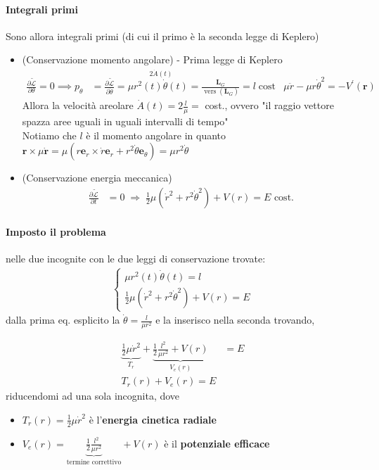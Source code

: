 \documentclass[a4paper,10pt]{article}
\theoremstyle{definition}
\DeclareMathOperator*{\vers}{vers}
\newcommand{\bv}{\boldsymbol} %
\theoremstyle{indentdefinition}
\theoremstyle{indenttheorem}
\theoremstyle{myremark}
\theoremstyle{indentgeneral}
\begin{document}
\paragraph{Integrali primi} Sono allora integrali primi (di cui il primo è la seconda legge di
Keplero)
\begin{itemize}
    \item (Conservazione momento angolare) - Prima legge di Keplero
    \begin{align*}
       \frac{\partial \widetilde{\mathcal{L}}}{\partial\theta}=0\implies p_{\theta} & =\frac{\partial\widetilde{\mathcal{L}}}{\partial\dot{\theta}}=\mu \overset{2\dot{A}(t)}{\boxed{r^{2}(t)\dot{\theta}(t)}}=\frac{\boldsymbol{L}_{G}}{\vers\left(\boldsymbol{L}_{G}\right)}=l\;\text{cost} & \mu\ddot{r}-\mu r\dot{\theta}^{2}=-V^{\prime}\left(\boldsymbol{r}\right)  
    \end{align*}
     Allora la velocità areolare $\dot{A}(t)=2\frac{l}{\mu}=$ cost., ovvero "il raggio vettore spazza aree uguali in uguali intervalli di tempo" \\
     Notiamo che $l$ è il momento angolare in quanto $\bv{r}\times\mu\dot{\bv{r}}=\mu(r\bv{e}_r\times\dot{r}\bv{e}_r+r^2\dot{\theta}\bv{e}_\theta)=\mu r^2\dot{\theta}$
    \item (Conservazione energia meccanica)
    \begin{align*}
        \frac{\partial\widetilde{\mathcal{L}}}{\partial t} & =0\;\Rightarrow\;\frac{1}{2}\mu\left(\dot{r}^{2}+r^{2}\dot{\theta}^{2}\right)+V\left(r\right)=E \text{ cost.}
    \end{align*}
\end{itemize}

\paragraph{Imposto il problema} nelle due incognite con le due leggi di conservazione trovate:
\begin{align*}
    \begin{cases}
        \mu r^2(t)\dot{\theta}(t)=l \\
        \frac{1}{2}\mu(\dot{r}^{2}+r^{2}\dot{\theta}^{2})+V\left(r\right)=E
    \end{cases}
\end{align*}
dalla prima eq. esplicito la $\dot{\theta}=\frac{l}{\mu r^2}$ e la inserisco nella seconda trovando, 

\begin{align*}
\underbrace{\frac{1}{2}\mu \dot{r}^2}_{T_r}+\underbrace{\frac{1}{2}\frac{l^2}{\mu r^2}+V(r)}_{V_e(r)}&=E \\
T_r(r)+V_e(r)=E
\end{align*}
riducendomi ad una sola incognita, dove 
\begin{itemize}
    \item $T_r(r)=\frac{1}{2}\mu \dot{r}^2$ è l'\textbf{energia cinetica radiale} 
    \item $V_e(r)=\underbrace{\frac{1}{2}\frac{l^2}{\mu r^2}}_{\text{termine correttivo}}+V(r)$ è il \textbf{potenziale efficace}
\end{itemize}
\end{document}
